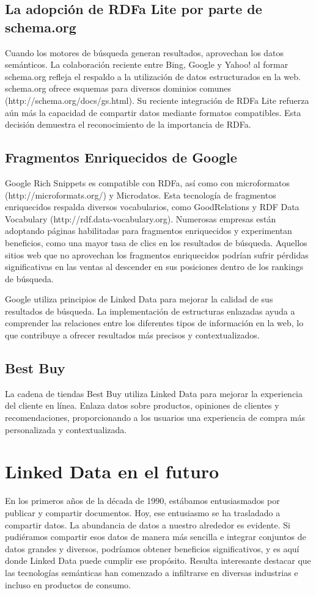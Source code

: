 \documentclass[11pt]{report}
\begin{document}
\section{La adopción de RDFa Lite por parte de schema.org}

		Cuando los motores de búsqueda generan resultados, aprovechan los datos semánticos. La colaboración reciente entre Bing, Google y Yahoo! al formar schema.org refleja el respaldo a la utilización de datos estructurados en la web. schema.org ofrece esquemas para diversos dominios comunes (http://schema.org/docs/gs.html). Su reciente integración de RDFa Lite refuerza aún más la capacidad de compartir datos mediante formatos compatibles. Esta decisión demuestra el reconocimiento de la importancia de RDFa.
\section{Fragmentos Enriquecidos de Google}

		Google Rich Snippets es compatible con RDFa, así como con microformatos (http://microformats.org/) y Microdatos. Esta tecnología de fragmentos enriquecidos respalda diversos vocabularios, como GoodRelations y RDF Data Vocabulary (http://rdf.data-vocabulary.org). Numerosas empresas están adoptando páginas habilitadas para fragmentos enriquecidos y experimentan beneficios, como una mayor tasa de clics en los resultados de búsqueda. Aquellos sitios web que no aprovechan los fragmentos enriquecidos podrían sufrir pérdidas significativas en las ventas al descender en sus posiciones dentro de los rankings de búsqueda.

        Google utiliza principios de Linked Data para mejorar la calidad de sus resultados de búsqueda. La implementación de estructuras enlazadas ayuda a comprender las relaciones entre los diferentes tipos de información en la web, lo que contribuye a ofrecer resultados más precisos y contextualizados.

\section{Best Buy}

		La cadena de tiendas Best Buy utiliza Linked Data para mejorar la experiencia del cliente en línea. Enlaza datos sobre productos, opiniones de clientes y recomendaciones, proporcionando a los usuarios una experiencia de compra más personalizada y contextualizada.

\chapter{Linked Data en el futuro}
En los primeros años de la década de 1990, estábamos entusiasmados por publicar y compartir documentos. Hoy, ese entusiasmo se ha trasladado a compartir datos. La abundancia de datos a nuestro alrededor es evidente. Si pudiéramos compartir esos datos de manera más sencilla e integrar conjuntos de datos grandes y diversos, podríamos obtener beneficios significativos, y es aquí donde Linked Data puede cumplir ese propósito. Resulta interesante destacar que las tecnologías semánticas han comenzado a infiltrarse en diversas industrias e incluso en productos de consumo.
\end{document}

